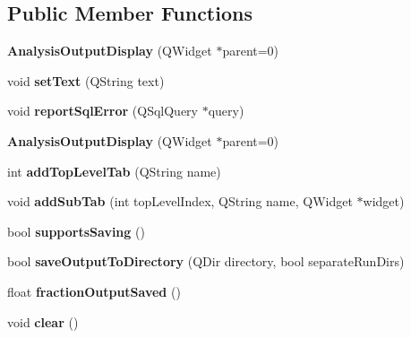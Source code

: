 \subsection*{Public Member Functions}
\begin{DoxyCompactItemize}
\item 
\hypertarget{class_analysis_output_display_a5c94a2e859e8510b9756a9c9583d5572}{{\bfseries Analysis\-Output\-Display} (Q\-Widget $\ast$parent=0)}\label{class_analysis_output_display_a5c94a2e859e8510b9756a9c9583d5572}

\item 
\hypertarget{class_analysis_output_display_a37619d81f6096a3c35e56bfa0cd54904}{void {\bfseries set\-Text} (Q\-String text)}\label{class_analysis_output_display_a37619d81f6096a3c35e56bfa0cd54904}

\item 
\hypertarget{class_analysis_output_display_ac7c517b004b977286820c87049966b6d}{void {\bfseries report\-Sql\-Error} (Q\-Sql\-Query $\ast$query)}\label{class_analysis_output_display_ac7c517b004b977286820c87049966b6d}

\item 
\hypertarget{class_analysis_output_display_a5c94a2e859e8510b9756a9c9583d5572}{{\bfseries Analysis\-Output\-Display} (Q\-Widget $\ast$parent=0)}\label{class_analysis_output_display_a5c94a2e859e8510b9756a9c9583d5572}

\item 
\hypertarget{class_analysis_output_display_a0b176eb672cf446ced019ad6c99adbc9}{int {\bfseries add\-Top\-Level\-Tab} (Q\-String name)}\label{class_analysis_output_display_a0b176eb672cf446ced019ad6c99adbc9}

\item 
\hypertarget{class_analysis_output_display_ae0c21d70133029d950eba29667c46552}{void {\bfseries add\-Sub\-Tab} (int top\-Level\-Index, Q\-String name, Q\-Widget $\ast$widget)}\label{class_analysis_output_display_ae0c21d70133029d950eba29667c46552}

\item 
\hypertarget{class_analysis_output_display_acb6171a7460ed16dcc38e9c2a6f1e23d}{bool {\bfseries supports\-Saving} ()}\label{class_analysis_output_display_acb6171a7460ed16dcc38e9c2a6f1e23d}

\item 
\hypertarget{class_analysis_output_display_a708dba4434ed76380b8e8807eeeea563}{bool {\bfseries save\-Output\-To\-Directory} (Q\-Dir directory, bool separate\-Run\-Dirs)}\label{class_analysis_output_display_a708dba4434ed76380b8e8807eeeea563}

\item 
\hypertarget{class_analysis_output_display_a1b369c5ce2c03e2b87cd07a70f63a286}{float {\bfseries fraction\-Output\-Saved} ()}\label{class_analysis_output_display_a1b369c5ce2c03e2b87cd07a70f63a286}

\item 
\hypertarget{class_analysis_output_display_a72d067978498b77e9ff64843aeff7253}{void {\bfseries clear} ()}\label{class_analysis_output_display_a72d067978498b77e9ff64843aeff7253}

\end{DoxyCompactItemize}


